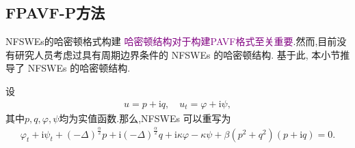 \documentclass[aspectratio=169]{beamer}
\numberwithin{theorem}{section} %
\numberwithin{equation}{section}%
\numberwithin{figure}{section}%
\numberwithin{table}{section}%
\begin{document}
\subsection{FPAVF-P方法}
		
		

\begin{frame}{NFSWEs的哈密顿格式构建}
	\textcolor{purple}{哈密顿结构对于构建PAVF格式至关重要}.然而,目前没有研究人员考虑过具有周期边界条件的 NFSWEs 的哈密顿结构.
	基于此, 本小节推导了 NFSWEs 的哈密顿结构.
	
	设
	\begin{align}
	u = p+\mathrm{i}q, \quad u_t = \varphi+ \mathrm{i}\psi,
	\end{align}
	其中$p, q,\varphi,\psi$均为实值函数.那么,NFSWEs  可以重写为
	\begin{align}\label{eq_PAVF:28}
	\varphi_{t}+\mathrm{i}\psi_{t}+\left( -\Delta \right) ^{\frac{\alpha }{2}}p+\mathrm{i}\left( -\Delta \right) ^{\frac{\alpha }{2}}q+\mathrm{i}\kappa \varphi-\kappa \psi+\beta \left( p^{2}+q^{2}\right) \left( p+\mathrm{i} q\right) =0.
	\end{align}
	\end{frame}
\end{document}
